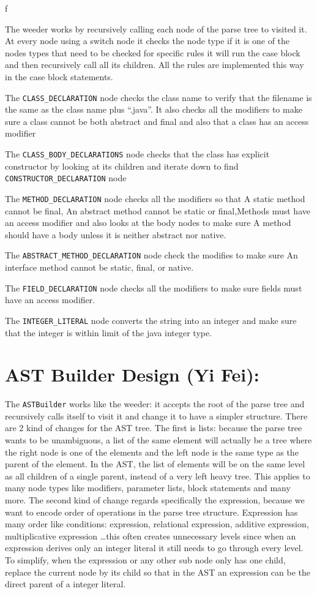 f\documentclass[12pt]{article}
\begin{document}
The weeder works by recursively calling each node of the parse tree to visited it. At every node
using a switch node it checks the node type if it is one of the nodes types that need to be checked
for specific rules it will run the case block and then recursively call all its children. All the
rules are implemented this way in the case block statements.

The \texttt{CLASS\_DECLARATION} node checks  the class name to verify that the filename is the same
as the class name plus ``.java''.  It also checks all the modifiers to make sure a class cannot be
both abstract and final and also that a class has an access modifier

The \texttt{CLASS\_BODY\_DECLARATIONS} node checks that the class has explicit constructor by
looking at its children and iterate down to find \texttt{CONSTRUCTOR\_DECLARATION} node

The \texttt{METHOD\_DECLARATION} node checks all the modifiers so that A static method cannot be
final, An abstract method cannot be static or final,Methods must have an access modifier and also
looks at the body nodes to make sure A method should have a body unless it is neither abstract nor
native.

The \texttt{ABSTRACT\_METHOD\_DECLARATION} node check the modifies to make sure An interface method
cannot be static, final, or native.

The \texttt{FIELD\_DECLARATION} node checks all the modifiers to make sure fields must have an
access modifier.

The \texttt{INTEGER\_LITERAL} node converts the string into an integer and make sure that the
integer is within limit of the java integer type.


\section*{AST Builder Design (Yi Fei):}

The \texttt{ASTBuilder} works like the weeder: it accepts the root of the parse tree and recursively
calls itself to visit it and change it to have a simpler structure. There are 2 kind of changes for
the AST tree. The first is lists: because the parse tree wants to be unambiguous, a list of the same
element will actually be a tree where the right node is one of the elements and the left node is the
same type as the parent of the element. In the AST, the list of elements will be on the same level
as all children of a single parent, instead of a very left heavy tree. This applies to many node
types like modifiers, parameter lists, block statements and many more. The second kind of change
regards specifically the expression, because we want to encode order of operations in the parse tree
structure. Expression has many order like conditions: expression, relational expression, additive
expression, multiplicative expression \ldots this often creates unnecessary levels since when an
expression derives only an integer literal it still needs to go through every level. To simplify,
when the expression or any other sub node only has one child, replace the current node by its child
so that in the AST an expression can be the direct parent of a integer literal.
\end{document}

